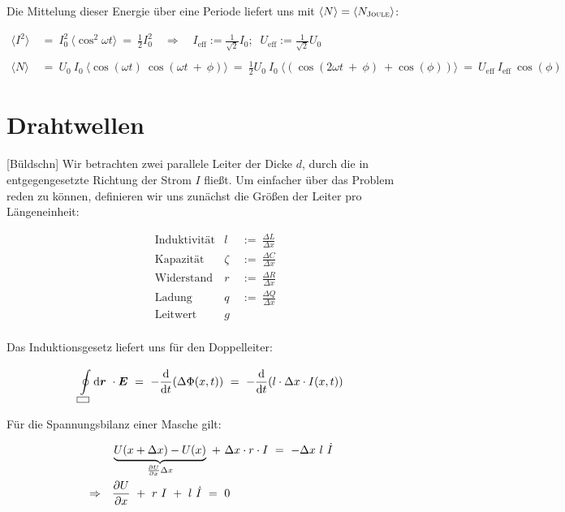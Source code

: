 Die Mittelung dieser Energie über eine Periode liefert uns mit $\langle N \rangle = \langle N_{\textsc{Joule}} \rangle$:

\begin{align*}
\langle I^2 \rangle \ &= \ I_0^2 \ \langle\cos^2\omega t \rangle  \ = \  \frac{1}{2}I_0^2 \quad \Rightarrow\quad I_{\text{eff}} := \frac{1}{\sqrt{2}}I_0; \; \; U_{\text{eff}}:= \frac{1}{\sqrt{2}}U_0\\
\ \\
\langle N \rangle  \ &= \ U_0 \ I_0 \ \Big\langle\cos (\omega t) \ \cos(\omega t \ + \ \phi) \Big\rangle  \ = \  \frac{1}{2}U_0 \ I_0 \ \Big\langle\left(\cos(2\omega t \ + \ \phi) \ + \cos (\phi)\right)\Big\rangle  \ = \ U_{\text{eff}} \ I_{\text{eff}} \ \cos(\phi)
\end{align*}


\section{Drahtwellen}

[Büldschn]
Wir betrachten zwei parallele Leiter der Dicke $d$, durch die in entgegengesetzte Richtung der Strom $I$ fließt. Um einfacher über das Problem reden zu können, definieren wir uns zunächst die Größen der Leiter pro Längeneinheit:

\begin{align*}
&\text{Induktivität}  & l \ &:= \ \frac{\Delta L}{\Delta x}\\
&\text{Kapazität}   & \zeta  \ &:= \ \frac{\Delta C}{\Delta x}\\
&\text{Widerstand}   & r  \ &:= \ \frac{\Delta R}{\Delta x}\\
&\text{Ladung}   &q \ &:= \ \frac{\Delta Q}{\Delta x}\\
&\text{Leitwert}   &g   
\end{align*}
\ \\

Das Induktionsgesetz liefert uns für den Doppelleiter:

\begin{equation*}
\Oint{\rectangle}{}{\vec{r}}\cdot\vec{E} \ = \ - \diff{}{t} (\Delta\Phi(x,t))  \ = \ - \diff{}{t} (l \cdot \Delta x \cdot I(x,t))
\end{equation*}


Für die Spannungsbilanz einer Masche gilt:

\begin{align*}
& \underbrace{U(x+\Delta x) - U(x)}_{\pdiff{U}{x}\Delta x} \ + \ \Delta x \cdot r  \cdot I  \ = \ - \Delta x \ l \ \dot{I}\\
\Rightarrow\quad &\pdiff{U}{x} \ + \ r \ I \ + \ l \ \dot{I}  \ = \ 0
\end{align*}

